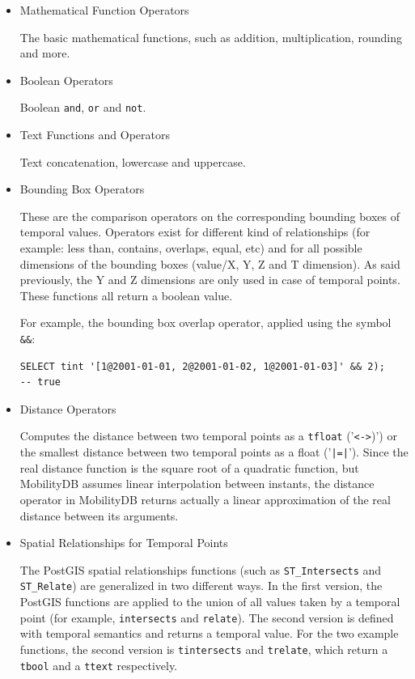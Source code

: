 \begin{itemize}
    \item Mathematical Function Operators

        The basic mathematical functions, such as addition, multiplication, rounding and more.

    \item Boolean Operators

        Boolean \lstinline{and}, \lstinline{or} and \lstinline{not}.

    \item Text Functions and Operators

        Text concatenation, lowercase and uppercase.

    \item Bounding Box Operators

        These are the comparison operators on the corresponding bounding boxes of temporal values. Operators exist for different kind of relationships (for example: less than, contains, overlaps, equal, etc) and for all possible dimensions of the bounding boxes (value/X, Y, Z and T dimension). As said previously, the Y and Z dimensions are only used in case of temporal points. These functions all return a boolean value.

        For example, the bounding box overlap operator, applied using the symbol \lstinline{&&}:
        \begin{lstlisting}
SELECT tint '[1@2001-01-01, 2@2001-01-02, 1@2001-01-03]' && 2);
-- true
        \end{lstlisting}

    \item Distance Operators

        Computes the distance between two temporal points as a \lstinline{tfloat} ('\lstinline+<->+)') or the smallest distance between two temporal points as a float ('\lstinline+|=|+'). Since the real distance function is the square root of a quadratic function, but MobilityDB assumes linear interpolation between instants, the distance operator in MobilityDB returns actually a linear approximation of the real distance between its arguments.

    \item Spatial Relationships for Temporal Points

        The PostGIS spatial relationships functions (such as \lstinline{ST_Intersects} and \lstinline{ST_Relate}) are generalized in two different ways. In the first version, the PostGIS functions are applied to the union of all values taken by a temporal point (for example, \lstinline{intersects} and \lstinline{relate}). The second version is defined with temporal semantics and returns a temporal value. For the two example functions, the second version is \lstinline{tintersects} and \lstinline{trelate}, which return a \lstinline{tbool} and a \lstinline{ttext} respectively.


\end{itemize}
